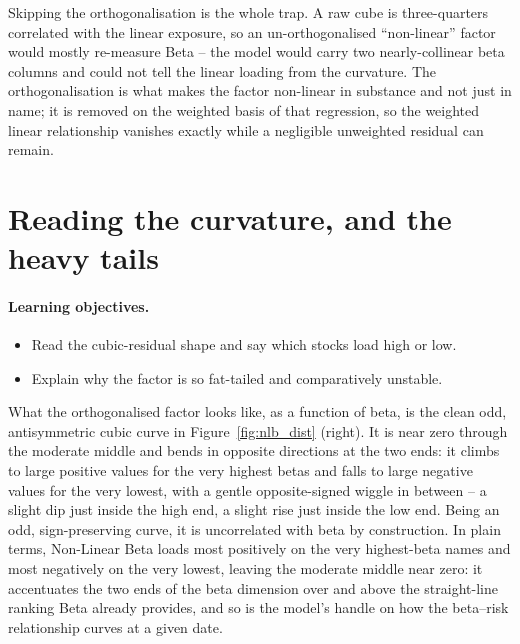 \documentclass[11pt]{article}
\theoremstyle{definition}
\theoremstyle{plain}
\theoremstyle{remark}
\begin{document}
\begin{pitfall}
Skipping the orthogonalisation is the whole trap. A raw cube is three-quarters correlated with the linear exposure, so an un-orthogonalised ``non-linear'' factor would mostly re-measure Beta -- the model would carry two nearly-collinear beta columns and could not tell the linear loading from the curvature. The orthogonalisation is what makes the factor non-linear in substance and not just in name; it is removed on the weighted basis of that regression, so the weighted linear relationship vanishes exactly while a negligible unweighted residual can remain.
\end{pitfall}

\section{Reading the curvature, and the heavy tails}\label{sec:curve}

\paragraph{Learning objectives.}
\begin{itemize}[leftmargin=1.4em,topsep=2pt]
  \item Read the cubic-residual shape and say which stocks load high or low.
  \item Explain why the factor is so fat-tailed and comparatively unstable.
\end{itemize}

What the orthogonalised factor looks like, as a function of beta, is the clean odd, antisymmetric cubic curve in Figure~\ref{fig:nlb_dist} (right). It is near zero through the moderate middle and bends in opposite directions at the two ends: it climbs to large positive values for the very highest betas and falls to large negative values for the very lowest, with a gentle opposite-signed wiggle in between -- a slight dip just inside the high end, a slight rise just inside the low end. Being an odd, sign-preserving curve, it is uncorrelated with beta by construction. In plain terms, Non-Linear Beta loads most positively on the very highest-beta names and most negatively on the very lowest, leaving the moderate middle near zero: it accentuates the two ends of the beta dimension over and above the straight-line ranking Beta already provides, and so is the model's handle on how the beta--risk relationship curves at a given date.
\end{document}
